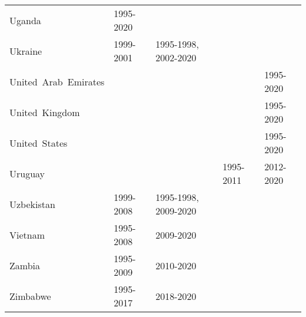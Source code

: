 \begin{appendices}
\begin{table}[H]
\begin{adjustbox}{width=\textwidth,center}
\begin{tabular}{|l|llll|}
	Uganda & 1995-2020 &  &  &  \\
	Ukraine & 1999-2001 & 1995-1998, 2002-2020 &  &  \\
	United\ Arab\ Emirates &  &  &  & 1995-2020 \\
	United\ Kingdom &  &  &  & 1995-2020 \\
	United\ States &  &  &  & 1995-2020 \\
	Uruguay &  &  & 1995-2011 & 2012-2020 \\
	Uzbekistan & 1999-2008 & 1995-1998, 2009-2020 &  &  \\
	Vietnam & 1995-2008 & 2009-2020 &  &  \\
	Zambia & 1995-2009 & 2010-2020 &  &  \\
	Zimbabwe & 1995-2017 & 2018-2020 &  &  \\
    \bottomrule
\end{tabular}
\end{adjustbox}
\end{table}

\newpage



\end{appendices}
